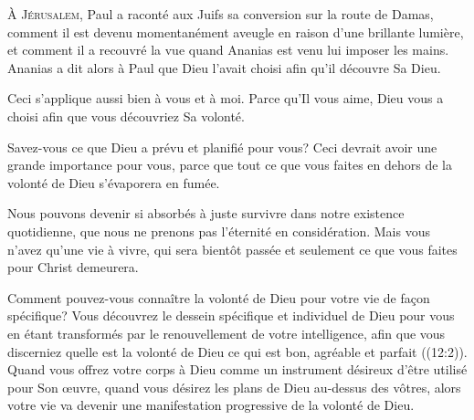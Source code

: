 



\lettrine{À}{ Jérusalem}, Paul a raconté aux Juifs sa conversion
 sur la route de Damas, comment il est devenu momentanément aveugle
 en raison d'une brillante lumière, et comment il a recouvré la vue
 quand Ananias est venu lui imposer les mains.
 Ananias a dit alors à Paul que Dieu l'avait choisi afin qu'il découvre
 Sa Dieu.

Ceci s'applique aussi bien à vous et à moi.
 Parce qu'Il vous aime, Dieu vous a choisi afin que vous découvriez Sa volonté.

Savez-vous ce que Dieu a prévu et planifié pour vous?
 Ceci devrait avoir une grande importance pour vous,
 parce que tout ce que vous faites en dehors de la volonté de Dieu s'évaporera en fumée.


Nous pouvons devenir si absorbés à juste survivre dans notre existence
 quotidienne, que nous ne prenons pas l'éternité en considération.
 Mais vous n'avez qu'une vie à vivre, qui sera bientôt passée
 et seulement ce que vous faites pour Christ demeurera.

Comment pouvez-vous connaître la volonté de Dieu pour votre vie
 de fa\c{c}on spécifique?
 Vous découvrez le dessein spécifique et individuel
 de Dieu pour vous en étant \Og transformés par le renouvellement
 de votre intelligence, afin que vous discerniez quelle est la volonté de Dieu\frcolon{}
 ce qui est bon, agréable et parfait \Fg{} ((12:2)).
 Quand vous offrez votre corps à Dieu comme un instrument désireux
 d'être utilisé pour Son \oe{}uvre, quand vous désirez les plans de Dieu
 au-dessus des vôtres, alors votre vie va devenir une manifestation
 progressive de la volonté de Dieu.


\dvrule




